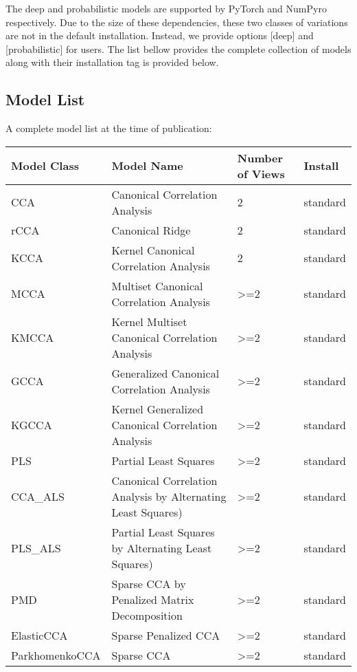 The deep and probabilistic models are supported by PyTorch and NumPyro respectively. Due to the size of these dependencies, these two classes of variations are not in the default installation. Instead, we provide options [deep] and [probabilistic] for users. The list bellow provides the complete collection of models along with their installation tag is provided below.

\subsection{Model List}

A complete model list at the time of publication:

\begin{center}
\begin{tabular}{|| p{}|p{}|p{}|p{} ||}
    \hline
    Model Class & Model Name & Number of Views & Install\\
    \hline \hline
    CCA & Canonical Correlation Analysis & 2 & standard\\
    \hline
    rCCA & Canonical Ridge & 2 & standard\\
    \hline
    KCCA & Kernel Canonical Correlation Analysis & 2 & standard\\
    \hline
    MCCA & Multiset Canonical Correlation Analysis & >=2 & standard\\
    \hline
    KMCCA & Kernel Multiset Canonical Correlation Analysis & >=2 & standard\\
    \hline
    GCCA & Generalized Canonical Correlation Analysis & >=2 & standard\\
    \hline
    KGCCA & Kernel Generalized Canonical Correlation Analysis & >=2 & standard\\
    \hline
    PLS & Partial Least Squares & >=2 & standard\\
    \hline
    CCA\_ALS & Canonical Correlation Analysis by Alternating Least Squares) \cite{golub1995canonical} & >=2 & standard\\
    \hline
    PLS\_ALS & Partial Least Squares by Alternating Least Squares) & >=2 & standard\\
    \hline
    PMD & Sparse CCA by Penalized Matrix Decomposition & >=2 & standard\\
    \hline
    ElasticCCA & Sparse Penalized CCA \cite{waaijenborg2008quantifying} & >=2 & standard\\
    \hline
    ParkhomenkoCCA & Sparse CCA \cite{parkhomenko2009sparse} & >=2 & standard\\

\end{tabular}
\end{center}
